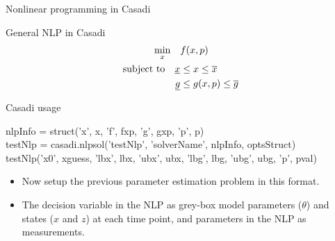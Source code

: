 \documentclass[xcolor=dvipsnames, 8pt]{beamer} %
\newcommand{\code}[1]{{\fontfamily{qcr}\selectfont#1}}
\begin{document}
\begin{frame}{Nonlinear programming in Casadi}
	
General NLP in Casadi
\begin{align*}
\underset{x}{\textnormal{min}} \quad &f(x, p) \\
\textnormal{subject to} \quad \underline{x} &\leq x \leq \overline{x} \\
\underline{g} &\leq g(x, p) \leq \overline{g}\\
\end{align*}

Casadi usage

\begin{center}
	
\code{nlpInfo = struct('x', x, 'f', fxp, 'g', gxp, 'p', p)} \\
\medskip
\code{testNlp = casadi.nlpsol('testNlp', 'solverName', nlpInfo, optsStruct)} \\
\medskip
\code{testNlp('x0', xguess, 'lbx', lbx, 'ubx', ubx, 'lbg', lbg, 'ubg', ubg, 
'p', pval)}
\end{center}

\begin{itemize}
	\item Now setup the previous parameter estimation problem in this format.
	\item The decision variable in the NLP as grey-box model parameters 
	($\theta$) and states ($x$ and $z$) at each time point, and parameters in 
	the NLP as measurements.
\end{itemize}
\end{frame}		
\end{document}
